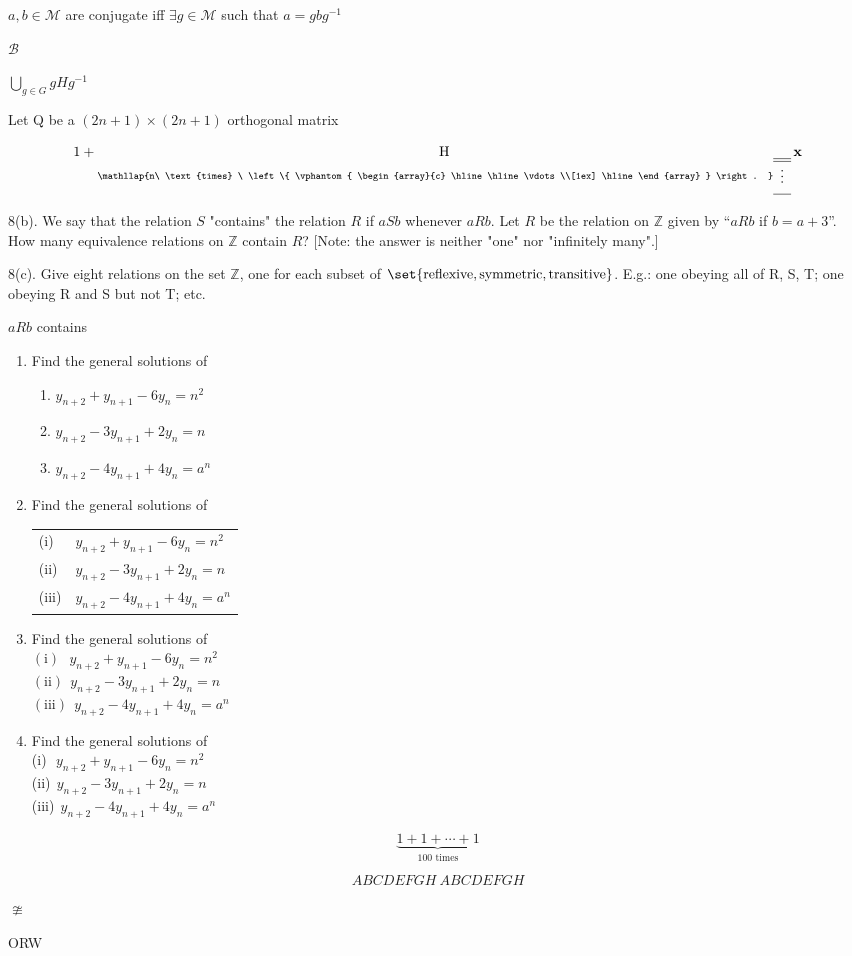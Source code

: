 \documentclass{article}
\newcommand*\tensordim[2]{
 \underset{
  \mathllap{#2\ \text{times}
  \ \left\{
   \vphantom{
    \begin{array}{c}
     \hline \hline \vdots \\[1ex] \hline
    \end{array}
   } \right.
  }
  \begin{array}{c}
   \hline \hline \vdots \\[1ex] \hline
  \end{array}
 }
 {\mathrm #1}
}
\begin{document}
\(a, b \in \mathcal M\) are conjugate iff \(\mathop\exists g \in \mathcal M\) such that \(a = g b g^{-1}\)

\(\mathscr B\)

\(\bigcup\limits_{g \in G} g H g^{-1}\)

Let Q be a \((2n+1)\times(2n+1)\) orthogonal matrix

\begin{equation*}
 1 + \tensordim{H}{n} \,\mathbf x
\end{equation*}

8(b). We say that the relation \(S\) "contains" the relation \(R\) if \(aSb\)
whenever \(aRb\).  Let \(R\) be the relation on \(\mathbb Z\) given by ``\(aRb\)
if \(b = a + 3\)''.  How many equivalence relations on \(\mathbb Z\) contain
\(R\)?  [Note: the answer is neither "one" nor "infinitely many".]

8(c). Give eight relations on the set \(\mathbb Z\), one for each subset of
\(\set{\text{reflexive}, \text{symmetric}, \text{transitive}}\).  E.g.: one
obeying all of R, S, T; one obeying R and S but not T; etc.


\(a R b\) contains

\begin{enumerate}
 \item Find the general solutions of
\begin{enumerate}[label=(\roman*)]
 \item \(y_{n + 2} + y_{n + 1} - 6 y_n = n^2\)
 \item \(y_{n + 2} - 3 y_{n + 1} + 2 y_n = n\)
 \item \(y_{n + 2} - 4 y_{n + 1} + 4 y_n = a^n\)
\end{enumerate}

\item Find the general solutions of \\
\begin{tabular}{ll}
  (i) & \(y_{n + 2} + y_{n + 1} - 6 y_n = n^2\) \\
 (ii) & \(y_{n + 2} - 3 y_{n + 1} + 2 y_n = n\) \\
(iii) & \(y_{n + 2} - 4 y_{n + 1} + 4 y_n = a^n\) \\
\end{tabular}

\item Find the general solutions of \\
\(  (\mathrm{i})\ \ \  y_{n + 2} + y_{n + 1} - 6 y_n = n^2\) \\
\( (\mathrm{ii})\ \  y_{n + 2} - 3 y_{n + 1} + 2 y_n = n\) \\
\((\mathrm{iii})\ \ y_{n + 2} - 4 y_{n + 1} + 4 y_n = a^n\)

\item Find the general solutions of \\
 (i)\(\ \ \  y_{n + 2} + y_{n + 1} - 6 y_n = n^2\) \\
 (ii)\(\ \  y_{n + 2} - 3 y_{n + 1} + 2 y_n = n\) \\
 (iii)\(\ \  y_{n + 2} - 4 y_{n + 1} + 4 y_n = a^n\)
\end{enumerate}

\begin{equation*}
 \underbrace{
  1 + 1 + \dotsb + 1
 }_{\text{\(100\) times}}
\end{equation*}

\begin{equation*}
 \mathit{ABCDEFGH}\ ABCDEFGH
\end{equation*}

\(\ncong\)

\Huge ORW
\end{document}
